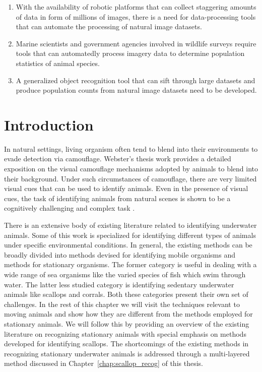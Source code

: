 \documentclass {udthesis}
\begin{document}
\begin{enumerate}[label=Section \arabic*:, start=0]
  \begin{enumerate} [label=Para \arabic*:, start=1]
   
   \item With the availability of robotic platforms that can collect staggering amounts of data in form of millions of images, there is a need for data-processing tools that can automate the processing of natural image datasets.
   
   \item Marine scientists and government agencies involved in wildlife surveys require tools that can automatedly process imagery data to determine population statistics of animal species.
   
   \item A generalized object recognition tool that can sift through large datasets and produce population counts from natural image datasets need to be developed.
   
  \end{enumerate}

\end{enumerate}

\section{Introduction}

In natural settings, living organism often tend to blend into their environments to evade detection via camouflage. Webster's thesis work \cite{webster} provides a detailed exposition on the visual camouflage mechanisms adopted by animals to blend into their background. Under such circumstances of camouflage, there are very limited visual cues that can be used to identify animals. Even in the presence of visual cues, the task of identifying animals from natural scenes is shown to be a cognitively challenging and complex task \cite{wichmann}.

There is an extensive body of existing literature related to identifying underwater animals. Some of this work is specialized for identifying different types of animals under specific environmental conditions. In general, the existing methods can be broadly divided into methods devised for identifying mobile organisms and methods for stationary organisms. The former category is useful in dealing with a wide range of sea organisms like the varied species of fish which swim through water. The latter less studied category is identifying sedentary underwater animals like scallops and corrals. Both these categories present their own set of challenges. In the rest of this chapter we will visit the techniques relevant to moving animals and show how they are different from the methods employed for stationary animals. We will follow this by providing an overview of the existing literature on recognizing stationary animals with special emphasis on methods developed for identifying scallops. The shortcomings of the 
existing methods in recognizing stationary underwater animals is addressed through a multi-layered method discussed in Chapter~\ref{chap:scallop_recog} of this thesis.
\end{document}
